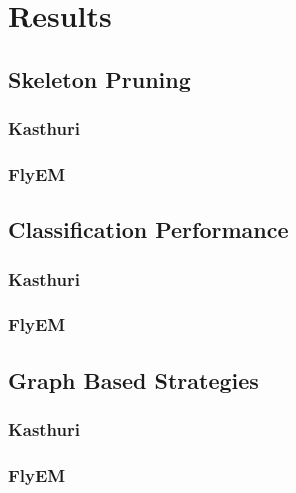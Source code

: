 \section{Results}

\subsection{Skeleton Pruning}

\subsubsection{Kasthuri}

\subsubsection{FlyEM}

\subsection{Classification Performance}

\subsubsection{Kasthuri}

\subsubsection{FlyEM}

\subsection{Graph Based Strategies}

\subsubsection{Kasthuri}

\subsubsection{FlyEM}




